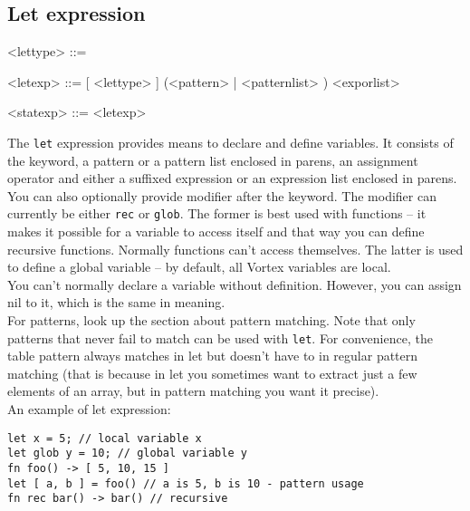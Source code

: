 \documentclass{article}
\newenvironment{bnf}
{
\begin{mdframed}
\begin{grammar}
}
{
\end{grammar}
\end{mdframed}
}
\begin{document}
\subsection{Let expression}
\begin{bnf}
<lettype> ::= 
    \alt {}

<letexp> ::=  [ <lettype> ] (<pattern> | \lit{(} <patternlist>
    \lit{)}) \lit{=} <exporlist>

<statexp> ::= <letexp>
\end{bnf}
The \verb|let| expression provides means to declare and define variables.
It consists of the keyword, a pattern or a pattern list enclosed in parens,
an assignment operator and either a suffixed expression or an expression
list enclosed in parens.\\
You can also optionally provide modifier after the keyword. The modifier
can currently be either \verb|rec| or \verb|glob|. The former is best used
with functions -- it makes it possible for a variable to access itself and
that way you can define recursive functions. Normally functions can't access
themselves. The latter is used to define a global variable -- by default,
all Vortex variables are local.\\
You can't normally declare a variable without definition. However, you can
assign nil to it, which is the same in meaning.\\
For patterns, look up the section about pattern matching. Note that only
patterns that never fail to match can be used with \verb|let|. For convenience,
the table pattern always matches in let but doesn't have to in regular
pattern matching (that is because in let you sometimes want to extract
just a few elements of an array, but in pattern matching you want it
precise).\\
An example of let expression:
\begin{lstlisting}[language=vortex]
let x = 5; // local variable x
let glob y = 10; // global variable y
fn foo() -> [ 5, 10, 15 ]
let [ a, b ] = foo() // a is 5, b is 10 - pattern usage
fn rec bar() -> bar() // recursive
\end{lstlisting}
\end{document}
